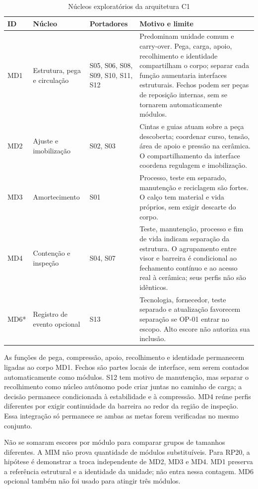 \begin{table}[H]
\centering\scriptsize\caption{Núcleos exploratórios da arquitetura C1}\label{tab:mim-modulos}
\begin{tabularx}{\textwidth}{L{0.8cm}L{3cm}L{3.1cm}Y}
\toprule\textbf{ID}&\textbf{Núcleo}&\textbf{Portadores}&\textbf{Motivo e limite}\\\midrule
MD1 & Estrutura, pega e circulação & S05, S06, S08, S09, S10, S11, S12 & Predominam unidade comum e carry-over. Pega, carga, apoio, recolhimento e identidade compartilham o corpo; separar cada função aumentaria interfaces estruturais. Fechos podem ser peças de reposição internas, sem se tornarem automaticamente módulos. \\
MD2 & Ajuste e imobilização & S02, S03 & Cintas e guias atuam sobre a peça descoberta; coordenar curso, tensão, área de apoio e pressão na cerâmica. O compartilhamento da interface coordena regulagem e imobilização. \\
MD3 & Amortecimento & S01 & Processo, teste em separado, manutenção e reciclagem são fortes. O calço tem material e vida próprios, sem exigir descarte do corpo. \\
MD4 & Contenção e inspeção & S04, S07 & Teste, manutenção, processo e fim de vida indicam separação da estrutura. O agrupamento entre visor e barreira é condicional ao fechamento contínuo e ao acesso real à cerâmica; seus perfis não são idênticos. \\
MD6* & Registro de evento opcional & S13 & Tecnologia, fornecedor, teste separado e atualização favorecem separação se OP-01 entrar no escopo. Alto escore não autoriza sua inclusão. \\
\bottomrule\end{tabularx}
\end{table}

As funções de pega, compressão, apoio, recolhimento e identidade permanecem ligadas ao corpo MD1. Fechos são partes locais de interface, sem serem contados automaticamente como módulos. S12 tem motivo de manutenção, mas separar o recolhimento como núcleo autônomo pode criar juntas no caminho de carga; a decisão permanece condicionada à estabilidade e à compressão. MD4 reúne perfis diferentes por exigir continuidade da barreira ao redor da região de inspeção. Essa integração só permanece se ambas as metas forem verificadas no mesmo conjunto.

Não se somaram escores por módulo para comparar grupos de tamanhos diferentes. A MIM não prova quantidade de módulos substituíveis. Para RP20, a hipótese é demonstrar a troca independente de MD2, MD3 e MD4. MD1 preserva a referência estrutural e a identidade da unidade; não entra nessa contagem. MD6 opcional também não foi usado para atingir três módulos.

